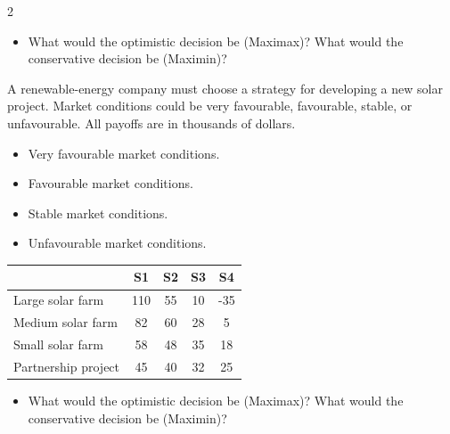 \begin{multicols}{2}
		
		\begin{itemize}
			\item [\textbf{(C4)}] What would the optimistic decision be (Maximax)? What would the conservative decision be (Maximin)? 
		\end{itemize}
		
		\columnbreak
		
		A renewable-energy company must choose a strategy for developing a new solar project. Market conditions could be very favourable, favourable, stable, or unfavourable. All payoffs are in thousands of dollars.
		
		\begin{itemize}
			\item[\textbf{S1}] Very favourable market conditions.
			\item[\textbf{S2}] Favourable market conditions.
			\item[\textbf{S3}] Stable market conditions.
			\item[\textbf{S4}] Unfavourable market conditions.
		\end{itemize}
		
		\begin{center}
			\renewcommand{\arraystretch}{1.3}
			\small
			\begin{tabular}{lcccc}
				\toprule
				& S1 & S2 & S3 & S4 \\
				\midrule
				Large solar farm    & 110 & 55 & 10 & -35 \\
				Medium solar farm   & 82  & 60 & 28 & 5   \\
				Small solar farm    & 58  & 48 & 35 & 18  \\
				Partnership project & 45  & 40 & 32 & 25  \\
				\bottomrule
			\end{tabular}
		\end{center}
		
		\begin{itemize}
			\item[\textbf{(C4)}] What would the optimistic decision be (Maximax)? What would the conservative decision be (Maximin)? 
		\end{itemize}
		
	\end{multicols}
	
